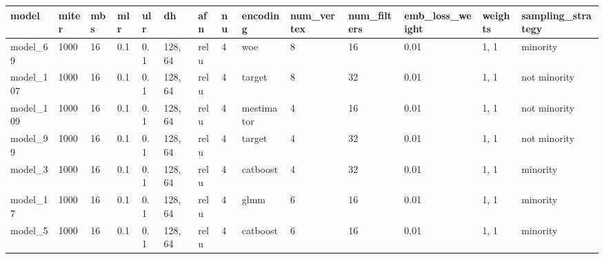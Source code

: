 \begin{tabular}{|l|l|l|l|l|l|l|l|l|l|l|l|l|l|}
\hline
\textbf{model} & \textbf{miter} & \textbf{mbs} & \textbf{mlr} & \textbf{ulr} & \textbf{dh} & \textbf{afn} & \textbf{nu} & \textbf{encoding} & \textbf{num\_vertex} & \textbf{num\_filters} & \textbf{emb\_loss\_weight} & \textbf{weights} & \textbf{sampling\_strategy} \\ \hline
model\_69      & 1000           & 16           & 0.1          & 0.1          & 128, 64     & relu         & 4           & woe               & 8                    & 16                    & 0.01                       & 1, 1             & minority                    \\ \hline
model\_107     & 1000           & 16           & 0.1          & 0.1          & 128, 64     & relu         & 4           & target            & 8                    & 32                    & 0.01                       & 1, 1             & not minority                \\ \hline
model\_109     & 1000           & 16           & 0.1          & 0.1          & 128, 64     & relu         & 4           & mestimator        & 4                    & 16                    & 0.01                       & 1, 1             & not minority                \\ \hline
model\_99      & 1000           & 16           & 0.1          & 0.1          & 128, 64     & relu         & 4           & target            & 4                    & 32                    & 0.01                       & 1, 1             & not minority                \\ \hline
model\_3       & 1000           & 16           & 0.1          & 0.1          & 128, 64     & relu         & 4           & catboost          & 4                    & 32                    & 0.01                       & 1, 1             & minority                    \\ \hline
model\_17      & 1000           & 16           & 0.1          & 0.1          & 128, 64     & relu         & 4           & glmm              & 6                    & 16                    & 0.01                       & 1, 1             & minority                    \\ \hline
model\_5       & 1000           & 16           & 0.1          & 0.1          & 128, 64     & relu         & 4           & catboost          & 6                    & 16                    & 0.01                       & 1, 1             & minority                    \\ \hline

\end{tabular}
